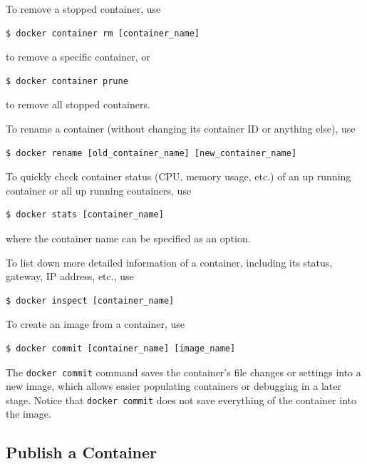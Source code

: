 To remove a stopped container, use
\begin{lstlisting}
$ docker container rm [container_name]
\end{lstlisting}
to remove a specific container, or
\begin{lstlisting}
$ docker container prune
\end{lstlisting}
to remove all stopped containers.

To rename a container (without changing its container ID or anything else), use
\begin{lstlisting}
$ docker rename [old_container_name] [new_container_name]
\end{lstlisting}

To quickly check container status (CPU, memory usage, etc.) of an up running container or all up running containers, use
\begin{lstlisting}
$ docker stats [container_name]
\end{lstlisting} 
where the container name can be specified as an option.

To list down more detailed information of a container, including its status, gateway, IP address, etc., use
\begin{lstlisting}
$ docker inspect [container_name]
\end{lstlisting}

To create an image from a container, use
\begin{lstlisting}
$ docker commit [container_name] [image_name]
\end{lstlisting}
The \verb|docker commit| command saves the container's file changes or settings into a new image, which allows easier populating containers or debugging in a later stage. Notice that \verb|docker commit| does not save everything of the container into the image.

\subsection{Publish a Container}


